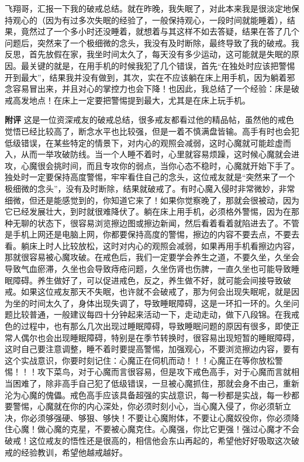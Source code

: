 \begin{case}
    飞翔哥，汇报一下我的破戒总结。就在昨晚，我失眠了，对此本来我是很淡定地保持观心的（因为有过多次失眠的经验了，一般保持观心，一段时间就能睡着），结果，竟然过了一个多小时还没睡着，就想着与其这样不如去答疑，结果在答了几个问题后，突然来了一个极细微的念头，我没有及时断除，最终导致了我的破戒。我反思，首先放假在家，我坐时间太久了，每天没有多少运动，这可能就是失眠的原因。最关键的就是，在用手机的时候我犯了几个错误，首先“在独处时应该把警惕开到最大”，结果我并没有做到，其次，实在不应该躺在床上用手机，因为躺着邪念容易冒出来，并且对心的掌控力也会下降！也因此，我总结了一个经验：床是破戒高发地点！在床上一定要把警惕提到最大，尤其是在床上玩手机。

    \textbf{附评} 这是一位资深戒友的破戒总结，很多戒友都看过他的精品帖，虽然他的戒色觉悟已经比较高了，断念水平也比较强，但是一着不慎满盘皆输。高手有时也会犯低级错误，在某些特定的情景下，对内心的观照会减弱，这时心魔就可能趁虚而入，从而一举攻破防线。当一个人睡不着时，心里就容易烦躁，这时候心魔就会进攻，心魔很会挑时间，而且专攻你的弱点，当你心态不稳时，心魔就开始下手了。独处时一定要保持高度警惕，牢牢看住自己的念头，这位戒友就是“突然来了一个极细微的念头”，没有及时断除，结果就破戒了。有时心魔入侵时非常微妙，非常细微，但还是能感觉到的，你知道它来了！如果你觉察晚了，那就会很被动，因为它已经发展壮大，到时就很难降伏了。躺在床上用手机，必须格外警惕，因为在那种无聊的状态下，很容易浏览擦边图或擦边新闻，然后看着看着就陷进去了。不管是手机上网还是电脑上网，你都要保持高度的警惕，擦边的内容不要去点，不要去看。躺床上时人比较放松，这时对内心的观照会减弱，如果再用手机看擦边内容，那就很容易被心魔攻破。在戒色后，我们一定要学会养生之道，不要久坐，久坐会导致气血瘀滞，久坐也会导致痔疮问题，久坐伤肾也伤脾，一直久坐也可能导致睡眠障碍。养生做好了，可以促进戒色，反之，养生做不好，就可能会间接导致破戒。如果这位戒友那天不失眠，也许就不会破戒了，那为何会出现失眠呢，就是因为坐的时间太久了，身体出现失调了，导致睡眠障碍，这是一环扣一环的。久坐问题比较普通，一般建议每四十分钟起来活动一下，走动走动，做下八段锦。在我戒色的过程中，也有那么几次出现过睡眠障碍，导致睡眠问题的原因有很多，即使正常人偶尔也会出现睡眠障碍，特别是在季节转换时，很容易出现短暂的睡眠障碍，这时自己要注意调整，睡不着时要提高警惕，加强观心，不要浏览擦边内容，要有这个实战意识，你要时刻记住：心魔正在伺机而动！！！心魔正在等你放松警惕！！！攻下菜鸟，对于心魔而言很容易，但是攻下戒色高手，对于心魔而言就相当困难了，除非高手自己犯了低级错误，一旦被心魔抓住，那就会身不由己，重新沦为心魔的傀儡。戒色高手应该具备超强的实战意识，每一秒都是实战，每一秒都要警惕，心魔就在你的内心深处，你必须时刻小心，当心魔入侵了，你必须斩立决，你必须够强硬、够狠、够快！不要让心魔附体，不要让心魔奴役你，你必须降住心魔！做心魔的克星，不要被心魔克住。心魔强，你比它更强！强过心魔才不会破戒！这位戒友的悟性还是很高的，相信他会东山再起的，希望他好好吸取这次破戒的经验教训，希望他越戒越好。
\end{case}

